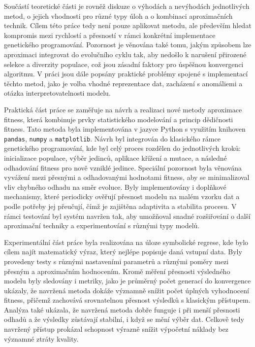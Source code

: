 \documentclass[12pt,a4paper]{report}
\begin{document}
\par Součástí teoretické části je rovněž diskuze o výhodách a nevýhodách jednotlivých metod, o jejich vhodnosti pro různé typy úloh a o kombinaci aproximačních technik. Cílem této práce tedy není pouze aplikovat metodu, ale především hledat kompromis mezi rychlostí a přesností v rámci konkrétní implementace genetického programování. Pozornost je věnována také tomu, jakým způsobem lze aproximaci integrovat do evolučního cyklu tak, aby nedošlo k narušení přirozené selekce a diverzity populace, což jsou zásadní faktory pro úspěšnou konvergenci algoritmu. V práci jsou dále popsány praktické problémy spojené s implementací těchto metod, jako je volba vhodné reprezentace dat, zacházení s anomáliemi a otázka interpretovatelnosti modelu.

\par Praktická část práce se zaměřuje na návrh a realizaci nové metody aproximace fitness, která kombinuje prvky statistického modelování a princip dědičnosti fitness. Tato metoda byla implementována v jazyce Python s využitím knihoven \texttt{pandas}, \texttt{numpy} a \texttt{matplotlib}. Návrh byl integrován do klasického rámce genetického programování, kde byl celý proces rozdělen do jednotlivých kroků: inicializace populace, výběr jedinců, aplikace křížení a mutace, a následné odhadování fitness pro nově vzniklé jedince. Speciální pozornost byla věnována vyvážení mezi přesnými a odhadovanými hodnotami fitness, aby se minimalizoval vliv chybného odhadu na směr evoluce. Byly implementovány i doplňkové mechanismy, které periodicky ověřují přesnost modelu na malém vzorku dat a podle potřeby jej přeučují, čímž je zajištěna adaptivita a stabilita procesu. V rámci testování byl systém navržen tak, aby umožňoval snadné rozšiřování o další aproximační techniky a experimentování s různými typy modelů.

\par Experimentální část práce byla realizována na úloze symbolické regrese, kde bylo cílem najít matematický výraz, který nejlépe popisuje daná vstupní data. Byly provedeny testy s různými nastaveními parametrů a různými poměry mezi přesným a aproximačním hodnocením. Kromě měření přesnosti výsledného modelu byly sledovány i metriky, jako je průměrný počet generací do konvergence ukázaly, že navržená metoda dokáže významně snížit počet úplných vyhodnocení fitness, přičemž zachovává srovnatelnou přesnost výsledků s klasickým přístupem. Analýza také ukázala, že navržená metoda dobře funguje i při menší přesnosti odhadů a že výsledky zůstávají stabilní, i když se mění výběr dat. Celkově tedy navržený přístup prokázal schopnost výrazně snížit výpočetní náklady bez významné ztráty kvality.
\end{document}
